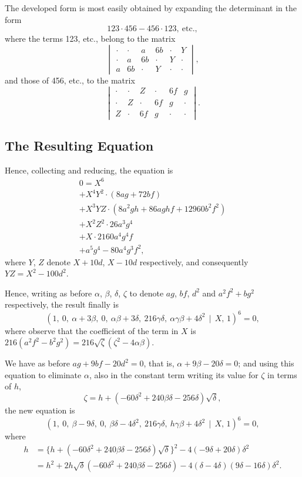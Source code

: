 \documentclass[11pt,a4paper]{article}
\theoremstyle{cayley}
\begin{document}
The developed form is most easily obtained by expanding the determinant in the form
\[
123 \cdot 456 - 456 \cdot 123,\ \text{etc.},
\]
where the terms 123, etc., belong to the matrix
\[
\begin{vmatrix}
\cdot & \cdot & a & 6b & \cdot & Y \\
\cdot & a & 6b & \cdot & Y & \cdot \\
a & 6b & \cdot & Y & \cdot & \cdot
\end{vmatrix},
\]
and those of 456, etc., to the matrix
\[
\begin{vmatrix}
\cdot & \cdot & Z & \cdot & 6f & g \\
\cdot & Z & \cdot & 6f & g & \cdot \\
Z & \cdot & 6f & g & \cdot & \cdot
\end{vmatrix}.
\]

\subsection*{The Resulting Equation}

Hence, collecting and reducing, the equation is
\begin{multline*}
0 = X^{6} \\
+ X^{4}Y^{2} \cdot (8ag + 72bf) \\
+ X^{3}YZ \cdot (8a^{2}gh + 86aghf + 12960b^{2}f^{2}) \\
+ X^{2}Z^{2} \cdot 26a^{3}g^{4} \\
+ X \cdot 2160a^{4}g^{4}f \\
+ a^{5}g^{4} - 80a^{4}g^{3}f^{2},
\end{multline*}
where $Y$, $Z$ denote $X+10d$, $X-10d$ respectively, and consequently $YZ = X^{2} - 100d^{2}$.

Hence, writing as before $\alpha$, $\beta$, $\delta$, $\zeta$ to denote $ag$, $bf$, $d^{2}$ and $a^{2}f^{2} + bg^{2}$ respectively, the result finally is
\[
(1,\ 0,\ \alpha+3\beta,\ 0,\ \alpha\beta+3\delta,\ 216\gamma\delta,\ \alpha\gamma\beta+4\delta^{2} \,\!\!\mid\!\!\, X,\, 1)^{6} = 0,
\]
where observe that the coefficient of the term in $X$ is $216(a^{2}f^{2} - b^{2}g^{2}) = 216\sqrt{\zeta}(\zeta^{2} - 4\alpha\beta)$.

We have as before $ag + 9bf - 20d^{2} = 0$, that is, $\alpha + 9\beta - 20\delta = 0$; and using this equation to eliminate $\alpha$, also in the constant term writing its value for $\zeta$ in terms of $h$,
\[
\zeta = h + (-60\delta^{2} + 240\beta\delta - 256\delta)\sqrt{\delta},
\]
the new equation is
\[
(1,\ 0,\ \beta-9\delta,\ 0,\ \beta\delta-4\delta^{2},\ 216\gamma\delta,\ h\gamma\beta+4\delta^{2} \,\!\!\mid\!\!\, X,\, 1)^{6} = 0,
\]
where
\begin{align*}
h &= \{h + (-60\delta^{2} + 240\beta\delta - 256\delta)\sqrt{\delta}\}^{2} - 4(-9\delta + 20\delta)\delta^{2} \\
&= h^{2} + 2h\sqrt{\delta}(-60\delta^{2} + 240\beta\delta - 256\delta) - 4(\delta - 4\delta)(9\delta - 16\delta)\delta^{2}.
\end{align*}
\end{document}
